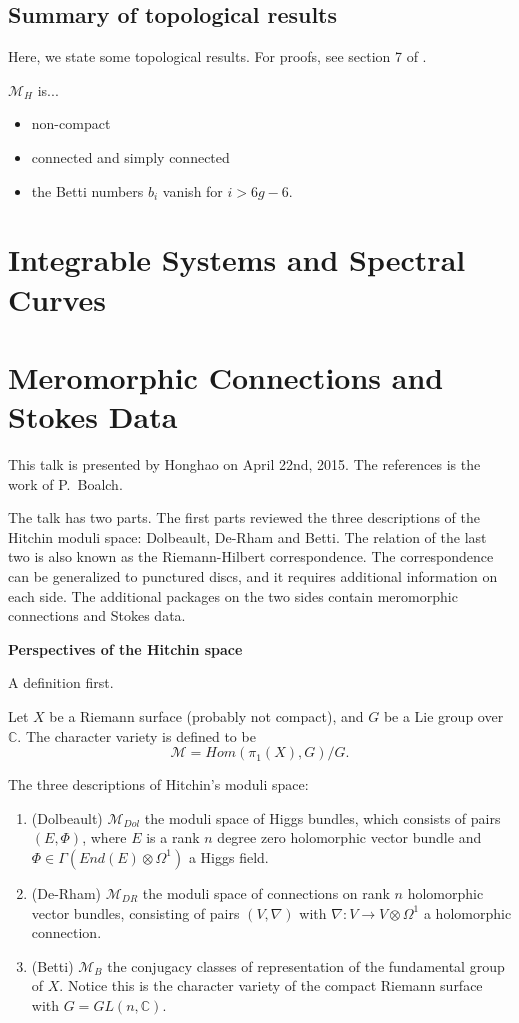 \documentclass[oneside,english]{amsbook}
\numberwithin{section}{chapter}
\numberwithin{equation}{section}
\numberwithin{figure}{section}
\theoremstyle{plain}
\theoremstyle{definition}
\theoremstyle{remark}
\theoremstyle{definition}
\theoremstyle{definition}
\theoremstyle{plain}
\begin{document}
\section{Summary of topological results}

Here, we state some topological results. For proofs, see section 7
of \cite{H1}.

$\mathcal{M}_{H}$ is...
\begin{itemize}
\item non-compact
\item connected and simply connected
\item the Betti numbers $b_{i}$ vanish for $i>6g-6.$
\end{itemize}


\chapter{Integrable Systems and Spectral Curves}


\chapter{Meromorphic Connections and Stokes Data}
This talk is presented by Honghao on  April 22nd, 2015. The references is the work of P.~Boalch.

The talk has two parts. The first parts reviewed the three descriptions of the Hitchin moduli space: Dolbeault, De-Rham and Betti. The relation of the last two is also known as the Riemann-Hilbert correspondence. The correspondence can be generalized to punctured discs, and it requires additional information on each side. The additional packages on the two sides contain meromorphic connections and Stokes data.

\medskip
\textbf{Perspectives of the Hitchin space}

A definition first.

Let $X$ be a Riemann surface (probably not compact), and $G$ be a Lie group over $\mathbb{C}$. The character variety is defined to be
$$\mathcal {M} = Hom (\pi_1(X),G)/G.$$

The three descriptions of Hitchin's moduli space:
\begin{enumerate}
  \item (Dolbeault) $\mathcal{M}_{Dol}$ the moduli space of Higgs bundles, which consists of pairs $(E,\Phi)$, where $E$ is a rank $n$ degree zero holomorphic vector bundle and $\Phi\in \Gamma(End(E)\otimes \Omega^1)$ a Higgs field.
  \item (De-Rham) $\mathcal{M}_{DR}$ the moduli space of connections on rank $n$ holomorphic vector bundles, consisting of pairs $(V, \nabla)$ with $\nabla: V\rightarrow V \otimes \Omega^1$ a holomorphic connection.
  \item (Betti) $\mathcal{M}_{B}$ the conjugacy classes of representation of the fundamental group of $X$. Notice this is the character variety of the compact Riemann surface with $G=GL(n,\mathbb{C})$.
\end{enumerate}
\end{document}
